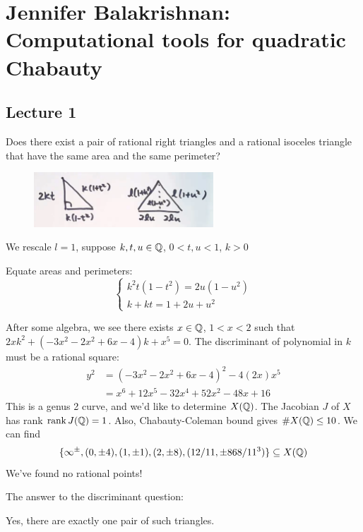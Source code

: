 \newpage
\section{Jennifer Balakrishnan: Computational tools for quadratic Chabauty}
\subsection{Lecture 1}

\begin{ques}
Does there exist a pair of rational right triangles and a rational isoceles triangle that have the same area and the same perimeter?
\end{ques}

	\begin{figure}[!ht]
	\centering
	\includegraphics[width=0.6\textwidth]{../images/im4.png}
	\end{figure}


We rescale $l=1$, suppose $k,t,u \in \mathbb{Q}$, $0<t,u<1$, $k>0$


Equate areas and perimeters:
	\[
	\begin{cases}
	k^2t(1-t^2)= 2u(1-u^2) \\
	k+kt= 1+2u+u^2
	\end{cases}
	\]


After some algebra, we see there exists $x \in \mathbb{Q}$, $1<x<2$ such that $2xk^2+(-3x^2-2x^2+6x-4)k+x^5= 0$. The discriminant of polynomial in $k$ must be a rational square:
	\[
	\begin{aligned}
	y^2&= (-3x^2-2x^2+6x-4)^2-4(2x)x^5 \\
	&=x^6+12x^5-32x^4+52x^2-48x+16
	\end{aligned}
	\]
This is a genus 2 curve, and we'd like to determine $X(\mathbb{Q})$. The Jacobian $J$ of $X$ has rank $\operatorname{rank} J(\mathbb{Q})=1$. Also, Chabauty-Coleman bound gives $\#X(\mathbb{Q}) \leq 10$. We can find 
	\[
	\{\infty^\pm, (0,\pm 4), (1,\pm 1), (2, \pm 8), (12/11,\pm 868/11^3) \} \subseteq X(\mathbb{Q})
	\]
We've found no rational points!


The answer to the discriminant question:


\begin{thm}
Yes, there are exactly one pair of such triangles.
\end{thm}



